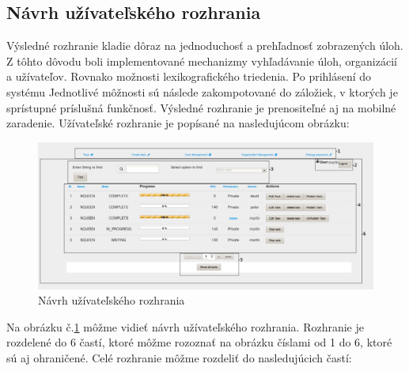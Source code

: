 \subsection{Návrh užívateľského rozhrania}
Výsledné rozhranie kladie dôraz na jednoduchosť a prehľadnosť zobrazených úloh. Z tôhto dôvodu boli implementované mechanizmy vyhľadávanie úloh, organizácií a užívateľov. Rovnako možnosti lexikografického triedenia. Po prihlásení do systému Jednotlivé môžnosti sú následe zakompotované do záložiek, v ktorých je sprístupné príslušná funkčnosť. Výsledné rozhranie je prenositeľné aj na mobilné zaradenie. Užívateľské rozhranie je popísané na nasledujúcom obrázku:
\begin{figure}[htb]

\begin{center}

\includegraphics[scale=0.4]{page.jpg} 
\caption{Návrh užívateľského rozhrania}
\label{rozhranie}

\end{center}

\end{figure}
Na obrázku č.\ref{rozhranie} môžme vidieť návrh užívateľského rozhrania. Rozhranie je rozdelené do 6 častí, ktoré môžme rozoznať na obrázku číslami od 1 do 6, ktoré sú aj ohraničené. Celé rozhranie môžme rozdeliť do nasledujúcich častí:
